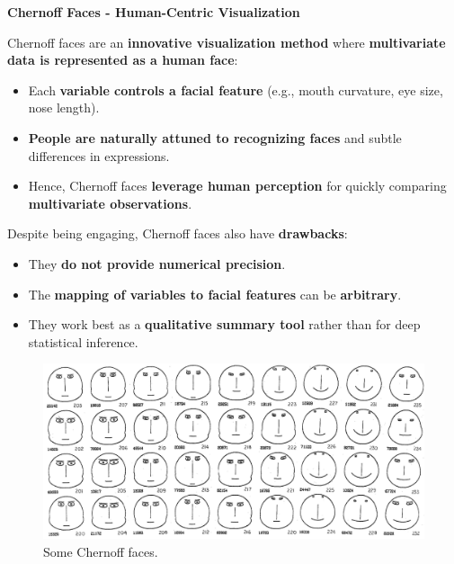 \newpage

\begin{flushleft}
    \textcolor{Green3}{ \textbf{Chernoff Faces - Human-Centric Visualization}}
\end{flushleft}
Chernoff faces \cite{chernoff1973use} are an \textbf{innovative visualization method} where \textbf{multivariate data is represented as a human face}:
\begin{itemize}
    \item Each \textbf{variable controls a facial feature} (e.g., mouth curvature, eye size, nose length).
    \item \textbf{People are naturally attuned to recognizing faces} and subtle differences in expressions.
    \item Hence, Chernoff faces \textbf{leverage human perception} for quickly comparing \textbf{multivariate observations}.
\end{itemize}
Despite being engaging, Chernoff faces also have \textbf{drawbacks}:
\begin{itemize}[label=\textcolor{Red2}{}]
    \item They \textbf{do not provide numerical precision}.
    \item The \textbf{mapping of variables to facial features} can be \textbf{arbitrary}.
    \item They work best as a \textbf{qualitative summary tool} rather than for deep statistical inference.
\end{itemize}

\begin{figure}[!htp]
    \centering
    \includegraphics[width=\textwidth]{img/chernoff-1973.jpg}
    \caption{Some Chernoff faces.\cite{chernoff1973use}}
\end{figure}


